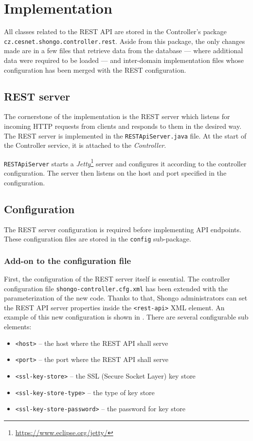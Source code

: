 \chapter{Implementation}
All classes related to the REST API are stored in the Controller’s package  \texttt{cz.cesnet.shongo.controller.rest}.
Aside from this package, the only changes made are in a few files that retrieve data from the database --- where additional data were required to be loaded --- and inter-domain implementation files\cite{pavelka2016shongo} whose configuration has been merged with the REST configuration.

\section{REST server}
The cornerstone of the implementation is the REST server which listens for incoming HTTP requests from clients and responds to them in the desired way. The REST server is implemented in the \texttt{RESTApiServer.java} file. At the start of the Controller service, it is attached to the \emph{Controller}.

\texttt{RESTApiServer} starts a \emph{Jetty}\footnote{\url{https://www.eclipse.org/jetty/}} server and configures it according to the controller configuration. The server then listens on the host and port specified in the configuration.

\section{Configuration}
The REST server configuration is required before implementing API endpoints. These configuration files are stored in the \texttt{config} sub-package.

\subsection{Add-on to the configuration file}
First, the configuration of the REST server itself is essential. The controller configuration file \texttt{shongo-controller.cfg.xml} has been extended with the parameterization of the new code. Thanks to that, Shongo administrators can set the REST API server properties inside the \texttt{<rest-api>} XML element. An example of this new configuration is shown in . There are several configurable sub elements:
\begin{itemize}
    \item \texttt{<host>} -- the host where the REST API shall serve
    \item \texttt{<port>} -- the port where the REST API shall serve
    \item \texttt{<ssl-key-store>} -- the SSL (Secure Socket Layer) key store
    \item \texttt{<ssl-key-store-type>} -- the type of key store
    \item \texttt{<ssl-key-store-password>} -- the password for key store
\end{itemize}

